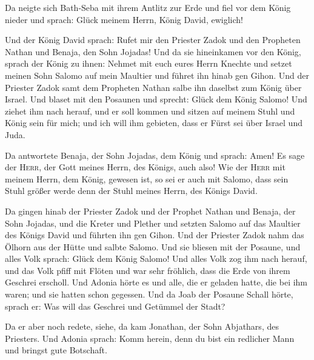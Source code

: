  Da neigte sich Bath-Seba mit ihrem Antlitz zur Erde und
fiel vor dem König nieder und sprach: Glück meinem Herrn, König David,
ewiglich!

 Und der König David sprach: Rufet mir den Priester Zadok
und den Propheten Nathan und Benaja, den Sohn Jojadas! Und da sie
hineinkamen vor den König,  sprach der König zu ihnen:
Nehmet mit euch eures Herrn Knechte und setzet meinen Sohn Salomo auf
mein Maultier und führet ihn hinab gen Gihon.  Und der
Priester Zadok samt dem Propheten Nathan salbe ihn daselbst zum König
über Israel. Und blaset mit den Posaunen und sprecht: Glück dem König
Salomo!  Und ziehet ihm nach herauf, und er soll kommen
und sitzen auf meinem Stuhl und König sein für mich; und ich will ihm
gebieten, dass er Fürst sei über Israel und Juda.

 Da antwortete Benaja, der Sohn Jojadas, dem König und
sprach: Amen! Es sage der \textsc{Herr}, der Gott meines Herrn, des
Königs, auch also!  Wie der \textsc{Herr} mit meinem
Herrn, dem König, gewesen ist, so sei er auch mit Salomo, dass sein
Stuhl größer werde denn der Stuhl meines Herrn, des Königs David.

 Da gingen hinab der Priester Zadok und der Prophet
Nathan und Benaja, der Sohn Jojadas, und die Kreter und Plether und
setzten Salomo auf das Maultier des Königs David und führten ihn gen
Gihon.  Und der Priester Zadok nahm das Ölhorn aus der
Hütte und salbte Salomo. Und sie bliesen mit der Posaune, und alles Volk
sprach: Glück dem König Salomo!  Und alles Volk zog ihm
nach herauf, und das Volk pfiff mit Flöten und war sehr fröhlich, dass
die Erde von ihrem Geschrei erscholl.  Und Adonia hörte
es und alle, die er geladen hatte, die bei ihm waren; und sie hatten
schon gegessen. Und da Joab der Posaune Schall hörte, sprach er: Was
will das Geschrei und Getümmel der Stadt?

 Da er aber noch redete, siehe, da kam Jonathan, der Sohn
Abjathars, des Priesters. Und Adonia sprach: Komm herein, denn du bist
ein redlicher Mann und bringst gute Botschaft.

